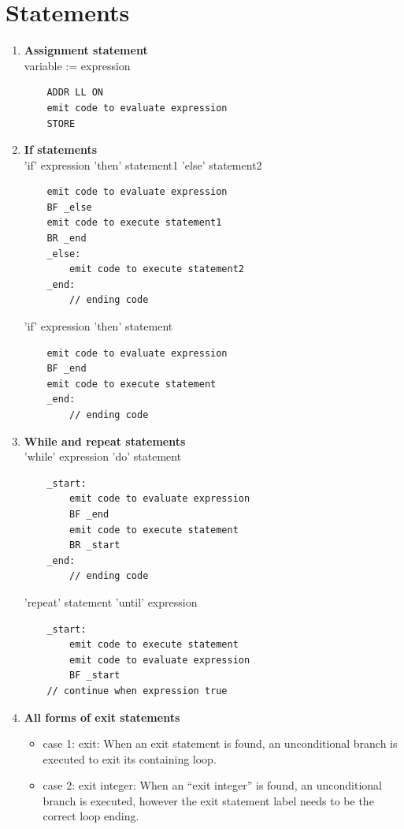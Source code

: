 \documentclass[11pt]{article}
\begin{document}
\section*{Statements}
\begin{enumerate}[label=(\alph*)]
\item \textbf{Assignment statement}\\
variable := expression
\begin{lstlisting}
    ADDR LL ON
    emit code to evaluate expression
    STORE
\end{lstlisting}

\item \textbf{If statements}\\
'if' expression 'then' statement1 'else' statement2
\begin{lstlisting}
    emit code to evaluate expression
    BF _else
    emit code to execute statement1
    BR _end
    _else:
    	emit code to execute statement2
    _end:
    	// ending code
\end{lstlisting}
'if' expression 'then' statement
\begin{lstlisting}
    emit code to evaluate expression
    BF _end
    emit code to execute statement
    _end:
    	// ending code
\end{lstlisting}

\item \textbf{While and repeat statements}\\
'while' expression 'do' statement
\begin{lstlisting}
    _start:
        emit code to evaluate expression
        BF _end
        emit code to execute statement
        BR _start
    _end:
    	// ending code
\end{lstlisting}
'repeat' statement 'until' expression
\begin{lstlisting}
    _start:
        emit code to execute statement
        emit code to evaluate expression
        BF _start
    // continue when expression true
\end{lstlisting}

\item \textbf{All forms of exit statements}
\begin{itemize}
\item case 1: exit:
    When an exit statement is found, an unconditional branch is
    executed to exit its containing loop.
    
\item case 2: exit integer:
    When an ``exit integer'' is found, an unconditional branch is executed, however
    the exit statement label needs to be the correct loop ending.
    

\end{itemize}
\end{enumerate}
\end{document}
